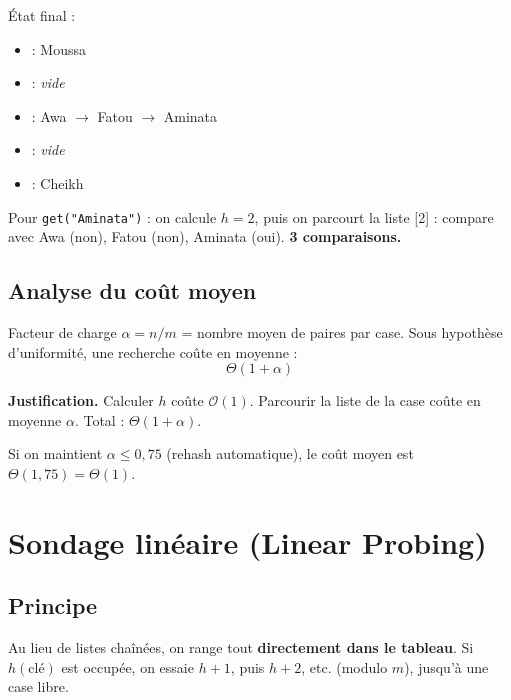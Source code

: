 \documentclass[11pt,a4paper]{article}
\newcommand{\bigO}{\mathcal{O}}
\begin{document}
\begin{appliboxR}[Réponse]
État final :
\begin{itemize}[nosep]
    \item [0] : Moussa
    \item [1] : \emph{vide}
    \item [2] : Awa $\to$ Fatou $\to$ Aminata
    \item [3] : \emph{vide}
    \item [4] : Cheikh
\end{itemize}

\medskip
Pour \texttt{get("Aminata")} : on calcule $h = 2$, puis on parcourt la liste [2] : compare avec Awa (non), Fatou (non), Aminata (oui). \textbf{3 comparaisons.}
\end{appliboxR}

\subsection{Analyse du coût moyen}

\begin{theorembox}
Facteur de charge $\alpha = n/m$ = nombre moyen de paires par case. Sous hypothèse d'uniformité, une recherche coûte en moyenne :
\[
\boxed{\Theta(1 + \alpha)}
\]
\end{theorembox}

\textbf{Justification.} Calculer $h$ coûte $\bigO(1)$. Parcourir la liste de la case coûte en moyenne $\alpha$. Total : $\Theta(1 + \alpha)$.

\begin{retenirbox}
Si on maintient $\alpha \leq 0{,}75$ (rehash automatique), le coût moyen est $\Theta(1{,}75) = \Theta(1)$.
\end{retenirbox}

\section{Sondage linéaire (Linear Probing)}

\subsection{Principe}

Au lieu de listes chaînées, on range tout \textbf{directement dans le tableau}. Si $h(\text{clé})$ est occupée, on essaie $h+1$, puis $h+2$, etc. (modulo $m$), jusqu'à une case libre.
\end{document}

